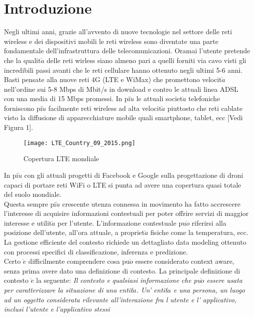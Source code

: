 \chapter*{Introduzione}
Negli ultimi anni, grazie all'avvento di nuove tecnologie nel settore delle reti wireless
e dei dispositivi mobili le reti wireless sono diventate una parte fondamentale
dell'infrastruttura delle telecomunicazioni. Oramai l'utente pretende che la qualit$\grave{a}$
delle reti wirless siano almeno pari a quelli forniti via cavo visti gli incredibili passi avanti
che le reti cellulare hanno ottenuto negli ultimi 5-6 anni.
Basti pensate alla nuove reti 4G (LTE e WiMax) che promettono velocit$\grave{a}$ nell'ordine sui 5-8 Mbps
di Mbit/s in download e contro le attuali linea ADSL con una media di 15 Mbps promessi.
In pi$\grave{u}$ le attuali societ$\grave{a}$ telefoniche forniscono pi$\grave{u}$ facilmente reti wireless ad alta velocit$\grave{a}$
piuttosto che reti cablate visto la diffusione di apparecchiature mobile quali smartphone, tablet, ecc [Vedi Figura 1].
\begin{figure}
\begin{center}
\texttt{[image: LTE\_Country\_09\_2015.png]}
\caption[Cop LTE]{Copertura LTE mondiale}
\label{etichetta}
\end{center}
\end{figure}
In pi$\grave{u}$ con gli attuali progetti di Facebook e Google sulla progettazione di droni capaci di portare
reti WiFi o LTE si punta ad avere una copertura quasi totale del suolo mondiale.\\
Questa sempre pi$\grave{u}$ crescente utenza connessa in movimento ha fatto accrescere l'interesse di
acquisire informazioni contestuali per poter offrire servizi di maggior interesse e utilit$\grave{a}$
per l'utente. L'informazione contestuale pu$\grave{o}$ riferirsi alla posizione dell'utente, all'ora attuale,
a propriet$\grave{a}$ fisiche come la temperatura, ecc.
La gestione efficiente del contesto richiede un dettagliato data modeling ottenuto
con processi specifici di classificazione, inferenza e predizione.\\
Certo $\grave{e}$ difficilmente comprendere cosa pu$\grave{o}$ essere considerato context aware,
senza prima avere dato una definizione di contesto. La principale definizione
di contesto $\grave{e}$ la seguente:
\textit{Il contesto e qualsiasi informazione che pu$\grave{o}$ essere usata per caratterizzare
la situazione di una entit$\grave{a}$. Un' entit$\grave{a}$ e una persona, un luogo ad un oggetto considerata rilevante all'interazione fra l utente
e l' applicativo, inclusi l'utente e l'applicativo stessi}
